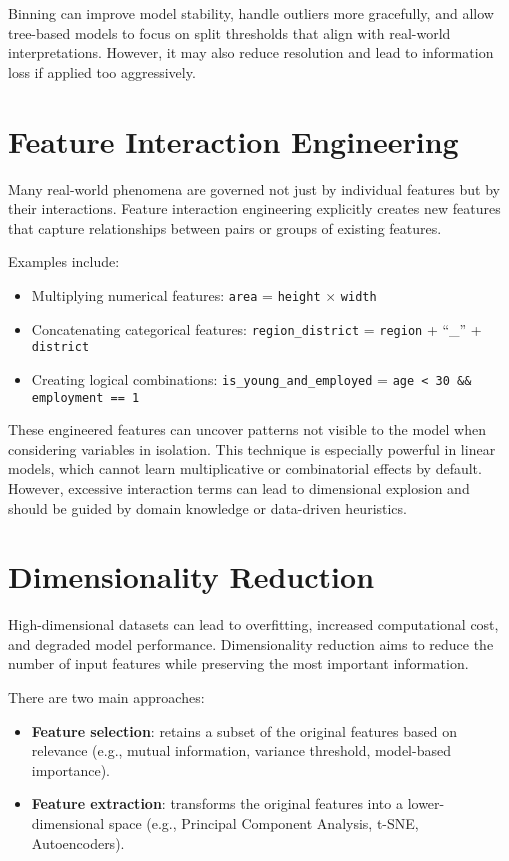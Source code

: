 \documentclass[12pt,openany]{book}
\begin{document}
Binning can improve model stability, handle outliers more gracefully, and allow tree-based models to focus on split thresholds that align with real-world interpretations. However, it may also reduce resolution and lead to information loss if applied too aggressively.



\section{Feature Interaction Engineering}

Many real-world phenomena are governed not just by individual features but by their interactions. Feature interaction engineering explicitly creates new features that capture relationships between pairs or groups of existing features.

Examples include:
\begin{itemize}
    \item Multiplying numerical features: \texttt{area} = \texttt{height} $\times$ \texttt{width}
    \item Concatenating categorical features: \texttt{region\_district} = \texttt{region} + ``\_'' + \texttt{district}
    \item Creating logical combinations: \texttt{is\_young\_and\_employed} = \texttt{age < 30 \&\& employment == 1}
\end{itemize}

These engineered features can uncover patterns not visible to the model when considering variables in isolation. This technique is especially powerful in linear models, which cannot learn multiplicative or combinatorial effects by default. However, excessive interaction terms can lead to dimensional explosion and should be guided by domain knowledge or data-driven heuristics.


\section{Dimensionality Reduction}

High-dimensional datasets can lead to overfitting, increased computational cost, and degraded model performance. Dimensionality reduction aims to reduce the number of input features while preserving the most important information.

There are two main approaches:
\begin{itemize}
    \item \textbf{Feature selection}: retains a subset of the original features based on relevance (e.g., mutual information, variance threshold, model-based importance).
    \item \textbf{Feature extraction}: transforms the original features into a lower-dimensional space (e.g., Principal Component Analysis, t-SNE, Autoencoders).
\end{itemize}
\end{document}

